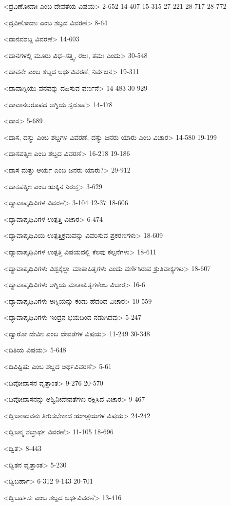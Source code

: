 <ದ್ರವಿಣೋದಾಃ ಎಂಬ ದೇವತೆಯ ವಿಷಯ>
2-652
14-407
15-315 
27-221
28-717 
28-772

<ದ್ರವಿಣೋದಾಃ ಎಂಬ ಶಬ್ದದ ವಿವರಣೆ>
8-64


<ದಾನವಶಬ್ದ ವಿವರಣೆ>
14-603

<ದಾನಗಳಲ್ಲಿ ಮೂರು ವಿಧ–ಸತ್ತ್ವ, ರಜಃ, ತಮಃ ಎಂದು>
30-548

<ದಾವನೇ ಎಂಬ ಶಬ್ದದ ಅರ್ಥವಿವರಣೆ, ನಿರ್ವಚನ>
19-311

<ದಾವಾಗ್ನಿಯು ವನವನ್ನು ದಹಿಸುವ ವರ್ಣನೆ>
14-483
30-929

<ದಾವಾನಲರೂಪದ ಅಗ್ನಿಯ ಸ್ವರೂಪ>
14-478

<ದಾಸ>
5-689

<ದಾಸ, ದಸ್ಯು ಎಂಬ ಶಬ್ದಗಳ ವಿವರಣೆ, ದಸ್ಯು ಜನರು ಯಾರು ಎಂಬ ವಿಚಾರ>
14-580
19-199

<ದಾಸಪತ್ನೀಃ ಎಂಬ ಶಬ್ದದ ವಿವರಣೆ>
16-218
19-186

<ದಾಸ ಮತ್ತು ಆರ್ಯ ಎಂಬ ಜನರು ಯಾರು?>
29-912

<ದಾಸಪತ್ನೀಃ ಎಂಬ ಋಕ್ಕಿನ ನಿರುಕ್ತ>
3-629

<ದ್ಯಾವಾಪೃಥಿವಿಗಳ ವಿವರಣೆ>
3-104 
12-37
18-606

<ದ್ಯಾವಾಪೃಥಿವಿಗಳ ಉತ್ಪತ್ತಿ ವಿಚಾರ>
6-474

<ದ್ಯಾವಾಪೃಥಿವಿಯ ಉತ್ಪತ್ತಿಕ್ರಮವನ್ನು ವಿವರಿಸುವ ಪ್ರಕರಣಗಳು>
18-609

<ದ್ಯಾವಾಪೃಥಿವಿಗಳ ಉತ್ಪತ್ತಿ ವಿಷಯದಲ್ಲಿ ಕೆಲವು ಕಲ್ಪನೆಗಳು>
18-611

<ದ್ಯಾವಾಪೃಥಿವಿಗಳು ವಿಶ್ವಕ್ಕೆಲ್ಲಾ ಮಾತಾಪಿತೃಗಳು ಎಂದು ವರ್ಣಿಸಿರುವ ಶ್ರುತಿವಾಕ್ಯಗಳು>
18-607

<ದ್ಯಾವಾಪೃಥಿವಿಗಳು ಅಗ್ನಿಯ ಮಾತಾಪಿತೃಗಳೆಂಬ ವಿಚಾರ>
16-6

<ದ್ಯಾವಾಪೃಥಿವಿಗಳು ಅಗ್ನಿಯನ್ನು ಕಂಡು ಹೆದರಿದ ವಿಚಾರ>
10-559

<ದ್ಯಾವಾಪೃಥಿವಿಗಳು ಇಂದ್ರನ ಭಯದಿಂದ ನಡುಗಿದವು>
5-247

<ದ್ವಾರೋ ದೇವೀಃ ಎಂಬ ದೇವತೆಗಳ ವಿಷಯ>
11-249
30-348

<ದಿತಿಯ ವಿಷಯ>
5-648

<ದಿವಿಷ್ಟಿಷು ಎಂಬ ಶಬ್ದದ ಅರ್ಥವಿವರಣೆ>
5-61

<ದಿವೋದಾಸನ ವೃತ್ತಾಂತ>
9-276
20-570

<ದಿವೋದಾಸನನ್ನು ಅಶ್ವಿನೀದೇವತೆಗಳು ರಕ್ಷಿಸಿದ ವಿಚಾರ>
9-467

<ದ್ವಿಜನಾದವನು ತೀರಿಸಬೇಕಾದ ಋಣತ್ರಯಗಳ ವಿಷಯ>
24-242

<ದ್ವಿಜನ್ಮ ಶಬ್ದಾರ್ಥ ವಿವರಣೆ>
11-105
18-696

<ದ್ವಿತ>
8-443

<ದ್ವಿತನ ವೃತ್ತಾಂತ>
5-230

<ದ್ವಿಬರ್ಹಾ>
6-312 
9-143
20-701

<ದ್ವಿಬರ್ಹಸಃ ಎಂಬ ಶಬ್ದದ ಅರ್ಥವಿವರಣೆ>
13-416

